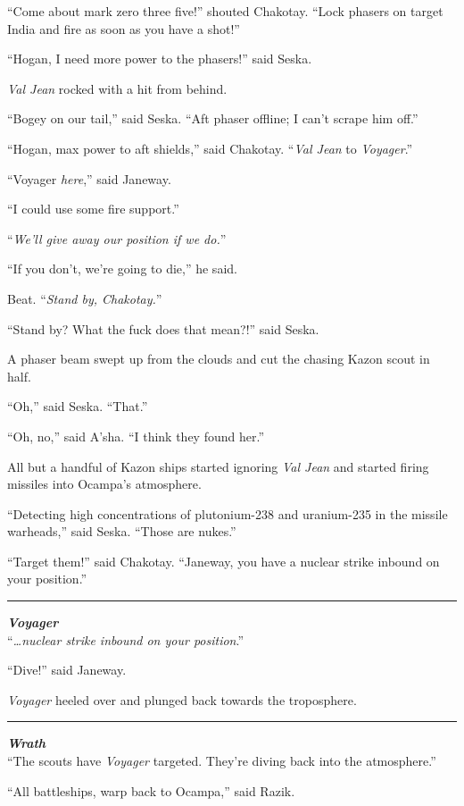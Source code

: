 \documentclass[twoside,letterpaper,12pt]{memoir}
\begin{document}
``Come about mark zero three five!'' shouted Chakotay. ``Lock phasers on target India and fire as soon as you have a shot!''

``Hogan, I need more power to the phasers!'' said Seska.

\textit{Val Jean} rocked with a hit from behind.

``Bogey on our tail,'' said Seska. ``Aft phaser offline; I can't scrape him off.''

``Hogan, max power to aft shields,'' said Chakotay. ``\textit{Val Jean} to \textit{Voyager}.''

``Voyager \textit{here},'' said Janeway.

``I could use some fire support.''

``\textit{We'll give away our position if we do.}''

``If you don't, we're going to die,'' he said.

Beat. ``\textit{Stand by, Chakotay.}''

``Stand by? What the fuck does that mean?!'' said Seska.

A phaser beam swept up from the clouds and cut the chasing Kazon scout in half.

``Oh,'' said Seska. ``That.''

``Oh, no,'' said A'sha. ``I think they found her.''

All but a handful of Kazon ships started ignoring \textit{Val Jean} and started firing missiles into Ocampa's atmosphere.

``Detecting high concentrations of plutonium-238 and uranium-235 in the missile warheads,'' said Seska. ``Those are nukes.''

``Target them!'' said Chakotay. ``Janeway, you have a nuclear strike inbound on your position.''

\fancybreak{\rule{3cm}{0.4 pt}}
\noindent\textit{\textbf{Voyager}}\\

``\textit{\ldots nuclear strike inbound on your position}.''

``Dive!'' said Janeway.

\textit{Voyager} heeled over and plunged back towards the troposphere.

\fancybreak{\rule{3cm}{0.4 pt}}
\noindent\textit{\textbf{Wrath}}\\

``The scouts have \textit{Voyager} targeted. They're diving back into the atmosphere.''

``All battleships, warp back to Ocampa,'' said Razik.
\end{document}
